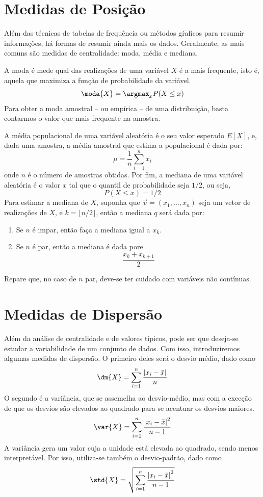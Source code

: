 \section{Medidas de Posição}

Além das técnicas de tabelas de frequência ou métodos gŕaficos para resumir
informações, há formas de resumir ainda mais os dados. Geralmente,
as mais comuns são medidas de centralidade: moda, média e mediana.

A moda é mede qual das realizações de uma variável $X$ é a mais frequente,
isto é, aquela que maximiza a função de probabilidade da variável.
\[
  \moda{X} = \argmax_x P(X \leq x)
\]
Para obter a moda amostral -- ou empírica -- de uma distribuição, basta contarmos
o valor que mais frequente na amostra.

A média populacional de uma variável aleatória é o seu valor esperado $E[X]$,
e, dada uma amostra, a média amostral que estima a populacional é dada por:
\[
  \mu = \frac{1}{n} \sum_{i=1}^n x_i
\]
onde $n$ é o número de amostras obtidas. Por fim, a mediana de uma variável
aleatória é o valor $x$ tal que o quantil de probabilidade seja $1/2$, ou seja,
\[
  P(X \leq x) = 1/2
\]
Para estimar a mediana de $X$, suponha que $\vec v = (x_1, \dots, x_n)$
seja um vetor de realizações de $X$, e $k = \lfloor n/2 \rfloor$, então
a mediana $q$ será dada por:

\begin{enumerate}
  \item Se $n$ é impar, então faça a mediana igual a $x_k$.

  \item Se $n$ é par, então a mediana é dada pore
    \[
      \frac{x_k + x_{k+1}}{2}
    \]
\end{enumerate}
Repare que, no caso de $n$ par, deve-se ter cuidado com variáveis não contínuas.

\section{Medidas de Dispersão}

Além da análise de centralidade e de valores típicos, pode ser que deseja-se
estudar a variabilidade de um conjunto de dados. Com isso, introduziremos
algumas medidas de dispersão. O primeiro deles será o desvio médio, dado como
\[
  \dm{X} = \sum_{i = 1}^n \frac{ \left| x_i - \bar x \right| }{n}
\]
O segundo é a variância, que se assemelha ao desvio-médio, mas com a exceção
de que os desvios são elevados ao quadrado para se acentuar os desvios maiores.
\[
  \var{X} = \sum_{i = 1}^n \frac{ \left| x_i - \bar x \right|^2 }{n-1}
\]
A variância gera um valor cuja a unidade está elevada ao quadrado, sendo menos
interpretável. Por isso, utiliza-se também o desvio-padrão, dado como
\[
  \std{X} = \sqrt{ \sum_{i = 1}^n \frac{ \left| x_i - \bar x \right|^2 }{n-1} }
\]

